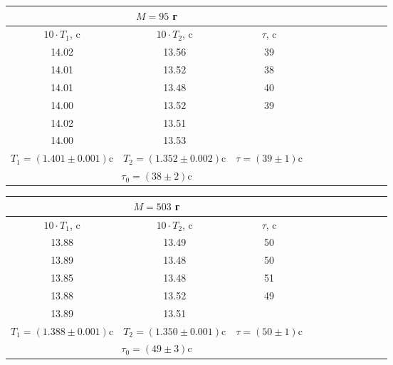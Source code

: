 \documentclass[14pt]{article}
\begin{document}
\begin{center}
\begin{tabular}{|c|c|c|c|c|c|c|c|c|c|c|}
\hline
\multicolumn{3}{|c|}{$M = 95$ г}	\\
\hline
$10\cdot T_1$, c	&	$10\cdot T_2$, c			&	$\tau$, c				\\
\hline
14.02				&	13.56						&	39						\\
\hline
14.01				&	13.52						&	38						\\
\hline
14.01				&	13.48						&	40						\\
\hline
14.00				&	13.52						&	39						\\
\hline
14.02				&	13.51						&							\\
\hline
14.00				&	13.53						&							\\
\hline
$T_1 = (1.401 \pm 0.001)$c		&	$T_2 = (1.352 \pm 0.002)$c		&	$\tau = (39 \pm 1)$c	\\
\hline
\multicolumn{3}{|c|}{$\tau_0 = (38 \pm 2)$c}								\\
\hline
\end{tabular}
\end{center}

\begin{center}
\begin{tabular}{|c|c|c|c|c|c|c|c|c|c|c|}
\hline
\multicolumn{3}{|c|}{$M = 503$ г}	\\
\hline
$10\cdot T_1$, c	&	$10\cdot T_2$, c			&	$\tau$, c				\\
\hline
13.88				&	13.49						&	50						\\
\hline
13.89				&	13.48						&	50						\\
\hline
13.85				&	13.48						&	51						\\
\hline
13.88				&	13.52						&	49						\\
\hline
13.89				&	13.51						&							\\
\hline
$T_1 = (1.388 \pm 0.001)$c		&	$T_2 = (1.350 \pm 0.001)$c		&	$\tau = (50 \pm 1)$c	\\
\hline
\multicolumn{3}{|c|}{$\tau_0 = (49 \pm 3)$c}									\\
\hline
\end{tabular}
\end{center}
\end{document}
